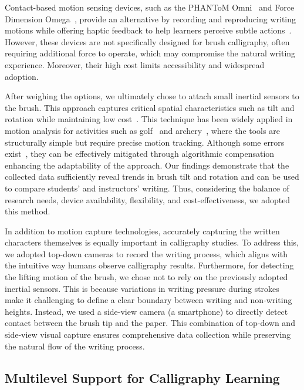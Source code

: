 Contact-based motion sensing devices, such as the PHANToM Omni~\cite{silva2009phantom} and Force Dimension Omega~\cite{chen2018patient}, provide an alternative by recording and reproducing writing motions while offering haptic feedback to help learners perceive subtle actions~\cite{10.1145/1255047.1255063, nishino2011calligraphy}. However, these devices are not specifically designed for brush calligraphy, often requiring additional force to operate, which may compromise the natural writing experience. Moreover, their high cost limits accessibility and widespread adoption.

After weighing the options, we ultimately chose to attach small inertial sensors to the brush. This approach captures critical spatial characteristics such as tilt and rotation while maintaining low cost~\cite{10.1145/3559400.3565595}. This technique has been widely applied in motion analysis for activities such as golf~\cite{king2008wireless, nam2013golf, fitzpatrick2010validation} and archery~\cite{phang2024archery, zhao2016archery}, where the tools are structurally simple but require precise motion tracking. Although some errors exist~\cite{fedorov2015using}, they can be effectively mitigated through algorithmic compensation~\cite{albaghdadi2019optimized, 10724704, 9289769, 10.1007/978-981-13-2553-3_36} enhancing the adaptability of the approach. Our findings demonstrate that the collected data sufficiently reveal trends in brush tilt and rotation and can be used to compare students’ and instructors’ writing. Thus, considering the balance of research needs, device availability, flexibility, and cost-effectiveness, we adopted this method.


In addition to motion capture technologies, accurately capturing the written characters themselves is equally important in calligraphy studies. To address this, we adopted top-down cameras to record the writing process, which aligns with the intuitive way humans observe calligraphy results. Furthermore, for detecting the lifting motion of the brush, we chose not to rely on the previously adopted inertial sensors. This is because variations in writing pressure during strokes make it challenging to define a clear boundary between writing and non-writing heights. Instead, we used a side-view camera (a smartphone) to directly detect contact between the brush tip and the paper. This combination of top-down and side-view visual capture ensures comprehensive data collection while preserving the natural flow of the writing process.


\subsection{Multilevel Support for Calligraphy Learning}

